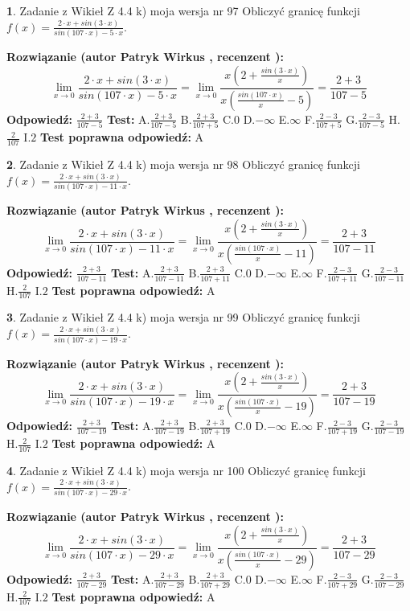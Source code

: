 \documentclass[12pt, a4paper]{article}
\theoremstyle{definition} %
\newtheorem{zad}{}
\newcommand{\zadStart}[1]{\begin{zad}#1\newline}
\newcommand{\zadStop}{\end{zad}}
\newcommand{\rozwStart}[2]{\noindent \textbf{Rozwiązanie (autor #1 , recenzent #2): }\newline}
\newcommand{\rozwStop}{\newline}
\newcommand{\odpStart}{\noindent \textbf{Odpowiedź:}\newline}
\newcommand{\odpStop}{\newline}
\newcommand{\testStart}{\noindent \textbf{Test:}\newline}
\newcommand{\testStop}{\newline}
\newcommand{\kluczStart}{\noindent \textbf{Test poprawna odpowiedź:}\newline}
\newcommand{\kluczStop}{\newline}
\begin{document}
\zadStart{Zadanie z Wikieł Z 4.4 k) moja wersja nr 97}
Obliczyć granicę funkcji $f(x)=\frac{2\cdot x +sin(3\cdot x)}{sin(107\cdot x) -5\cdot x}$.
\zadStop
\rozwStart{Patryk Wirkus}{}
$$\lim\limits_{x\to 0}\frac{2\cdot x +sin(3\cdot x)}{sin(107\cdot x) -5\cdot x}
=\lim\limits_{x\to 0}\frac{x(2+\frac{sin(3\cdot x)}{x})}{x(\frac{sin(107\cdot x)}{x}-5)}
=\frac{2+3}{107-5}$$
\rozwStop
\odpStart
$\frac{2+3}{107-5}$
\odpStop
\testStart
A.$\frac{2+3}{107-5}$
B.$\frac{2+3}{107+5}$
C.$0$
D.$-\infty$
E.$\infty$
F.$\frac{2-3}{107+5}$
G.$\frac{2-3}{107-5}$
H.$\frac{2}{107}$
I.$2$
\testStop
\kluczStart
A
\kluczStop



\zadStart{Zadanie z Wikieł Z 4.4 k) moja wersja nr 98}
Obliczyć granicę funkcji $f(x)=\frac{2\cdot x +sin(3\cdot x)}{sin(107\cdot x) -11\cdot x}$.
\zadStop
\rozwStart{Patryk Wirkus}{}
$$\lim\limits_{x\to 0}\frac{2\cdot x +sin(3\cdot x)}{sin(107\cdot x) -11\cdot x}
=\lim\limits_{x\to 0}\frac{x(2+\frac{sin(3\cdot x)}{x})}{x(\frac{sin(107\cdot x)}{x}-11)}
=\frac{2+3}{107-11}$$
\rozwStop
\odpStart
$\frac{2+3}{107-11}$
\odpStop
\testStart
A.$\frac{2+3}{107-11}$
B.$\frac{2+3}{107+11}$
C.$0$
D.$-\infty$
E.$\infty$
F.$\frac{2-3}{107+11}$
G.$\frac{2-3}{107-11}$
H.$\frac{2}{107}$
I.$2$
\testStop
\kluczStart
A
\kluczStop



\zadStart{Zadanie z Wikieł Z 4.4 k) moja wersja nr 99}
Obliczyć granicę funkcji $f(x)=\frac{2\cdot x +sin(3\cdot x)}{sin(107\cdot x) -19\cdot x}$.
\zadStop
\rozwStart{Patryk Wirkus}{}
$$\lim\limits_{x\to 0}\frac{2\cdot x +sin(3\cdot x)}{sin(107\cdot x) -19\cdot x}
=\lim\limits_{x\to 0}\frac{x(2+\frac{sin(3\cdot x)}{x})}{x(\frac{sin(107\cdot x)}{x}-19)}
=\frac{2+3}{107-19}$$
\rozwStop
\odpStart
$\frac{2+3}{107-19}$
\odpStop
\testStart
A.$\frac{2+3}{107-19}$
B.$\frac{2+3}{107+19}$
C.$0$
D.$-\infty$
E.$\infty$
F.$\frac{2-3}{107+19}$
G.$\frac{2-3}{107-19}$
H.$\frac{2}{107}$
I.$2$
\testStop
\kluczStart
A
\kluczStop



\zadStart{Zadanie z Wikieł Z 4.4 k) moja wersja nr 100}
Obliczyć granicę funkcji $f(x)=\frac{2\cdot x +sin(3\cdot x)}{sin(107\cdot x) -29\cdot x}$.
\zadStop
\rozwStart{Patryk Wirkus}{}
$$\lim\limits_{x\to 0}\frac{2\cdot x +sin(3\cdot x)}{sin(107\cdot x) -29\cdot x}
=\lim\limits_{x\to 0}\frac{x(2+\frac{sin(3\cdot x)}{x})}{x(\frac{sin(107\cdot x)}{x}-29)}
=\frac{2+3}{107-29}$$
\rozwStop
\odpStart
$\frac{2+3}{107-29}$
\odpStop
\testStart
A.$\frac{2+3}{107-29}$
B.$\frac{2+3}{107+29}$
C.$0$
D.$-\infty$
E.$\infty$
F.$\frac{2-3}{107+29}$
G.$\frac{2-3}{107-29}$
H.$\frac{2}{107}$
I.$2$
\testStop
\kluczStart
A
\kluczStop
\end{document}
